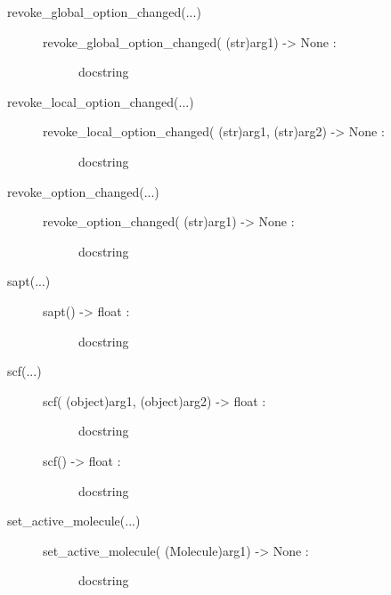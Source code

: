 \documentclass[letterpaper,10pt,english]{sphinxmanual}
\begin{document}
\begin{description}
\begin{description}
\begin{description}
\end{description}

\item[{revoke\_global\_option\_changed(...)}] \leavevmode\begin{description}
\item[{revoke\_global\_option\_changed( (str)arg1) -\textgreater{} None :}] \leavevmode
docstring

\end{description}

\item[{revoke\_local\_option\_changed(...)}] \leavevmode\begin{description}
\item[{revoke\_local\_option\_changed( (str)arg1, (str)arg2) -\textgreater{} None :}] \leavevmode
docstring

\end{description}

\item[{revoke\_option\_changed(...)}] \leavevmode\begin{description}
\item[{revoke\_option\_changed( (str)arg1) -\textgreater{} None :}] \leavevmode
docstring

\end{description}

\item[{sapt(...)}] \leavevmode\begin{description}
\item[{sapt() -\textgreater{} float :}] \leavevmode
docstring

\end{description}

\item[{scf(...)}] \leavevmode\begin{description}
\item[{scf( (object)arg1, (object)arg2) -\textgreater{} float :}] \leavevmode
docstring

\item[{scf() -\textgreater{} float :}] \leavevmode
docstring

\end{description}

\item[{set\_active\_molecule(...)}] \leavevmode\begin{description}
\item[{set\_active\_molecule( (Molecule)arg1) -\textgreater{} None :}] \leavevmode
docstring


\end{description}
\end{description}
\end{description}
\end{document}
